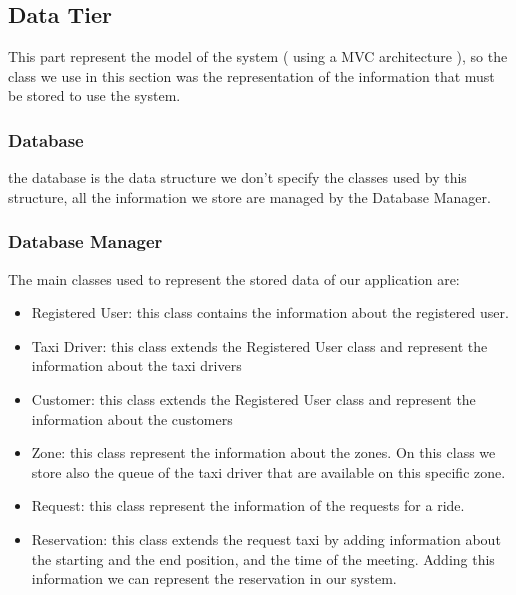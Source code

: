 \documentclass[../../../../../../dd.tex]{subfiles}
\begin{document}
	\subsection{Data Tier}
	This part represent the model of the system ( using a MVC architecture ), so the class we use in this section was the representation of the information that must be stored to use the system.
	\subsubsection{Database} the database is the data structure we don't specify the classes used by this structure, all the information we store are managed by the Database Manager.
	\subsubsection{Database Manager}
	The main classes used to represent the stored data of our application are:
	\begin{itemize}
	\item{Registered User}: this class contains the information about the registered user.
	\item{Taxi Driver}: this class extends the Registered User class and represent the information about the taxi drivers 
	\item{Customer}: this class extends the Registered User class and represent the information about the customers
	\item{Zone}: this class represent the information about the zones. On this class we store also the queue of the taxi driver that are available on this specific zone.
	\item{Request}: this class represent the information of the requests for a ride.
	\item{Reservation}: this class extends the request taxi by adding information about the starting and the end position, and the time of the meeting. Adding this information we can represent the reservation in our system.
	
	\end{itemize}
	 
\end{document}

